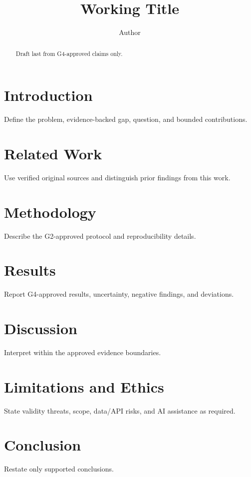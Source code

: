 \documentclass{article}
\title{Working Title}
\author{Author}
\date{}
\begin{document}
\maketitle

\begin{abstract}
Draft last from G4-approved claims only.
\end{abstract}

\section{Introduction}
Define the problem, evidence-backed gap, question, and bounded contributions.

\section{Related Work}
Use verified original sources and distinguish prior findings from this work.

\section{Methodology}
Describe the G2-approved protocol and reproducibility details.

\section{Results}
Report G4-approved results, uncertainty, negative findings, and deviations.

\section{Discussion}
Interpret within the approved evidence boundaries.

\section{Limitations and Ethics}
State validity threats, scope, data/API risks, and AI assistance as required.

\section{Conclusion}
Restate only supported conclusions.



\end{document}
